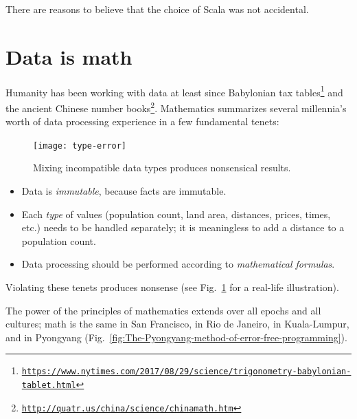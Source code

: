 There are reasons to believe that the choice of Scala was not accidental.

\section{Data is math}

Humanity has been working with data at least since Babylonian tax
tables\footnote{\texttt{\href{https://www.nytimes.com/2017/08/29/science/trigonometry-babylonian-tablet.html}{https://www.nytimes.com/2017/08/29/science/trigonometry-babylonian-tablet.html}}}
and the ancient Chinese number books\footnote{\texttt{\href{http://quatr.us/china/science/chinamath.htm}{http://quatr.us/china/science/chinamath.htm}}}.
Mathematics summarizes several millennia\textsf{'}s worth of data processing
experience in a few fundamental tenets:

\begin{figure}%
\begin{centering}
\vspace{-0.65\baselineskip}
\texttt{[image: type-error]}\vspace{-0.5\baselineskip}
\par\end{centering}
\caption{Mixing incompatible data types produces nonsensical results.\label{fig:A-nonsensical-calculation}}

\vspace{-3.5\baselineskip}
\end{figure}%

\begin{itemize}
\item Data is \emph{immutable}, because facts are immutable. 
\item Each \emph{type} of values (population count, land area, distances,
prices, times, etc.) needs to be handled separately; it is meaningless
to add a distance to a population count.
\item Data processing should be performed according to \emph{mathematical
formulas}. 
\end{itemize}
Violating these tenets produces nonsense (see Fig.\ \ref{fig:A-nonsensical-calculation}
for a real-life illustration).

The power of the principles of mathematics extends over all epochs
and all cultures; math is the same in San Francisco, in Rio de Janeiro,
in Kuala-Lumpur, and in Pyongyang (Fig.\ \ref{fig:The-Pyongyang-method-of-error-free-programming}).

